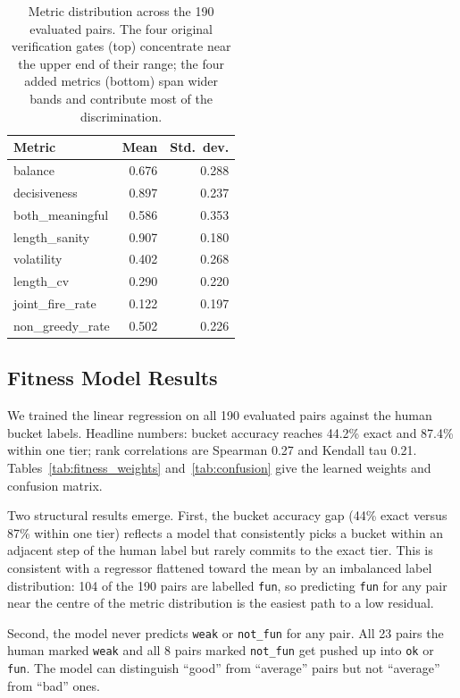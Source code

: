 \documentclass[conference]{IEEEtran}
\begin{document}
\begin{table}[ht!]
\centering
\caption{Metric distribution across the 190 evaluated pairs. The four original verification gates (top) concentrate near the upper end of their range; the four added metrics (bottom) span wider bands and contribute most of the discrimination.}
\label{tab:metric_distribution}
\begin{tabular}{|l|r|r|}
\hline
\textbf{Metric} & \textbf{Mean} & \textbf{Std.\ dev.} \\
\hline
balance         & 0.676 & 0.288 \\
\hline
decisiveness    & 0.897 & 0.237 \\
\hline
both\_meaningful & 0.586 & 0.353 \\
\hline
length\_sanity  & 0.907 & 0.180 \\
\hline
\hline
volatility      & 0.402 & 0.268 \\
\hline
length\_cv      & 0.290 & 0.220 \\
\hline
joint\_fire\_rate & 0.122 & 0.197 \\
\hline
non\_greedy\_rate & 0.502 & 0.226 \\
\hline
\end{tabular}
\end{table}

\subsection{Fitness Model Results}

We trained the linear regression on all 190 evaluated pairs against the human bucket labels. Headline numbers: bucket accuracy reaches 44.2\% exact and 87.4\% within one tier; rank correlations are Spearman 0.27 and Kendall tau 0.21. Tables~\ref{tab:fitness_weights} and~\ref{tab:confusion} give the learned weights and confusion matrix.

Two structural results emerge. First, the bucket accuracy gap (44\% exact versus 87\% within one tier) reflects a model that consistently picks a bucket within an adjacent step of the human label but rarely commits to the exact tier. This is consistent with a regressor flattened toward the mean by an imbalanced label distribution: 104 of the 190 pairs are labelled \texttt{fun}, so predicting \texttt{fun} for any pair near the centre of the metric distribution is the easiest path to a low residual.

Second, the model never predicts \texttt{weak} or \texttt{not\_fun} for any pair. All 23 pairs the human marked \texttt{weak} and all 8 pairs marked \texttt{not\_fun} get pushed up into \texttt{ok} or \texttt{fun}. The model can distinguish ``good'' from ``average'' pairs but not ``average'' from ``bad'' ones.
\end{document}
